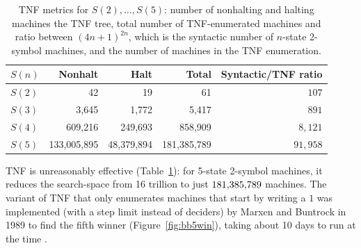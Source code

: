 \begin{table}[h!]
    \centering
    \begin{tabular}{|l|r|r|r|r|}
        \hline
        $S(n)$ & Nonhalt     & Halt       & Total       & Syntactic/TNF ratio \\
        \hline
        $S(2)$ & 42          & 19         & 61          & $107$               \\
        $S(3)$ & 3,645       & 1,772      & 5,417       & $891$               \\
        $S(4)$ & 609,216     & 249,693    & 858,909     & $8,121$             \\
        $S(5)$ & 133,005,895 & 48,379,894 & 181,385,789 & $91{,}958$          \\
        \hline
    \end{tabular}

    \caption{TNF metrics for $S(2),\dots,S(5)$: number of nonhalting and halting machines the TNF tree, total number of TNF-enumerated machines and ratio between $(4n+1)^{2n}$, which is the syntactic number of $n$-state 2-symbol machines, and the number of machines in the TNF enumeration.}\label{tab:TNF-numbers}
\end{table}

TNF is unreasonably effective (Table~\ref{tab:TNF-numbers}): for 5-state 2-symbol machines, it reduces the search-space from 16 trillion to just $181{,}385{,}789$ machines. The variant of TNF that only enumerates machines that start by writing a $1$ was implemented (with a step limit instead of deciders) by Marxen and Buntrock in 1989 to find the fifth \BBfull winner (Figure~\ref{fig:bb5win}), taking about 10 days to run at the time \cite{Marxen_1990}.


